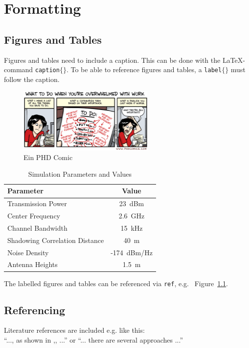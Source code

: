 \chapter{Formatting}

\section{Figures and Tables}
Figures and tables need to include a caption. This can be done with the LaTeX-command \texttt{\bslash caption$\lbrace\rbrace$}. To be able to reference figures and tables, a \texttt{\bslash label$\lbrace\rbrace$} must follow the caption.

\begin{figure}[h!]
  \begin{center}
    \includegraphics[width=0.6\textwidth]{phd112013s.eps}
    \caption{Ein PHD Comic}
    \label{fig:ToUseWithReference}
  \end{center}
\end{figure}

\begin{table}[b]
\begin{center}
\begin{tabular}{|l |c|}
\hline 
\textbf{Parameter} & \textbf{Value} \\
\hline  
\hline 
Transmission Power & 23~dBm\\
\hline 
Center Frequency & 2.6~GHz\\
\hline 
Channel Bandwidth & 15~kHz\\
\hline 
Shadowing Correlation Distance & 40~m\\
\hline 
Noise Density & -174~dBm/Hz\\
\hline 
Antenna Heights & 1.5~m\\
\hline 
\end{tabular}
\caption{Simulation Parameters and Values}\label{tab:param_table}
\end{center}
\end{table}

The labelled figures and tables can be referenced via \texttt{\bslash ref}, e.g. ~Figure~\ref{fig:ToUseWithReference}.
\newpage

\section{Referencing}
Literature references are included e.g. like this:\\
``..., as shown in \cite{eberspaecher97},, ...'' or ``... there are several approaches \cite{arnaud99,griswold90} ...''